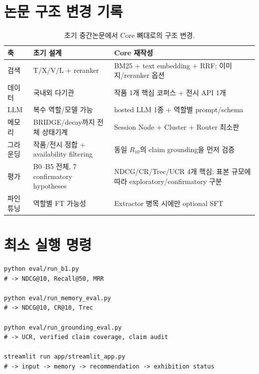 \documentclass[10pt,a4paper,twocolumn]{article}
\begin{document}
\section{논문 구조 변경 기록}
\begin{table}[H]
\centering
\caption{초기 중간논문에서 Core 뼈대로의 구조 변경.}
\small
\begin{tabularx}{0.97\textwidth}{@{}p{}p{}X@{}}
\toprule
축 & 초기 설계 & Core 재작성 \\
\midrule
검색 & T/X/V/L + reranker & BM25 + text embedding + RRF; 이미지/reranker 옵션 \\
데이터 & 국내외 다기관 & 작품 1개 핵심 코퍼스 + 전시 API 1개 \\
LLM & 복수 역할/모델 가능 & hosted LLM 1종 + 역할별 prompt/schema \\
메모리 & BRIDGE/decay까지 전체 상태기계 & Session Node + Cluster + Router 최소판 \\
그라운딩 & 작품/전시 정합 + availability filtering & 동일 $R_{10}$의 claim grounding을 먼저 검증 \\
평가 & B0--B5 전체, 7 confirmatory hypotheses & NDCG/CR/Trec/UCR 4개 핵심; 표본 규모에 따라 exploratory/confirmatory 구분 \\
파인튜닝 & 역할별 FT 가능성 & Extractor 병목 시에만 optional SFT \\
\bottomrule
\end{tabularx}
\end{table}

\section{최소 실행 명령}
\begin{lstlisting}
python eval/run_b1.py
# -> NDCG@10, Recall@50, MRR

python eval/run_memory_eval.py
# -> NDCG@10, CR@10, Trec

python eval/run_grounding_eval.py
# -> UCR, verified claim coverage, claim audit

streamlit run app/streamlit_app.py
# -> input -> memory -> recommendation -> exhibition status
\end{lstlisting}
\end{document}
